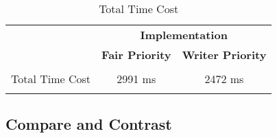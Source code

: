 \documentclass[a4paper,10pt]{article}
\begin{document}
\begin{table}[h]
\centering
\begin{tabular}{ |l|c|c| }
\hline
 \multirow{2}{*}{}&\multicolumn{2}{c|}{\textbf{Implementation}} \\ \cline{2-3}
 & \textbf{Fair Priority} & \textbf{Writer Priority} \\ \hline
\multirow{3}{*}{Total Time Cost}
 & & \\
 & 2991 ms & 2472 ms \\
  & & \\

 \hline

\end{tabular}
\caption{Total Time Cost}
\end{table}

\clearpage
\subsection{Compare and Contrast}
\end{document}
